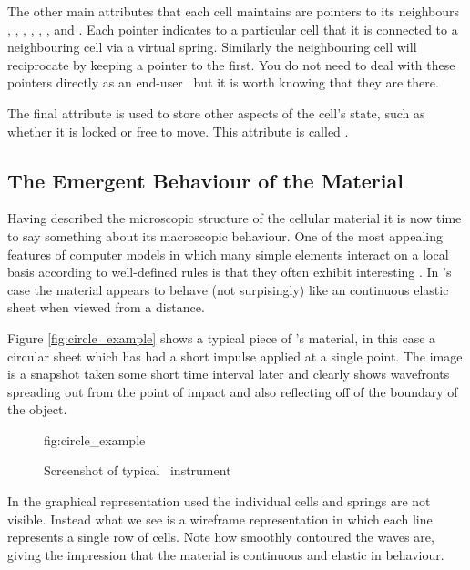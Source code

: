 The other main attributes that each cell maintains are pointers to its
neighbours , , ,
, , , 
and . Each pointer indicates to a particular cell that
it is connected to a neighbouring cell via a virtual spring. Similarly the
neighbouring cell will reciprocate by keeping a pointer to the first. You do
not need to deal with these pointers directly as an end-user \tao\ but it
is worth knowing that they are there. 

The final attribute is used to store other aspects of the cell's state,
such as whether it is locked or free to move. This attribute is called
.

\subsection{The Emergent Behaviour of the Material}
Having described the microscopic structure of the cellular material
it is now time to say something about its macroscopic behaviour.
One of the most appealing features of computer models in which many
simple elements interact on a local basis according to well-defined
rules is that they often exhibit interesting .
In \tao's case the material appears to behave (not surpisingly) like an
continuous elastic sheet when viewed from a distance.

Figure \ref{fig:circle_example} shows a typical piece of \tao's material,
in this case a circular sheet which has had a short impulse applied at a
single point. The image is a snapshot taken some short time interval later
and clearly shows wavefronts spreading out from the point of impact and
also reflecting off of the boundary of the object.

\begin{figure}[htb]
  \begin{Label}{fig:circle_example}
    \begin{center}
    \end{center}
    \caption{Screenshot of typical \tao\ instrument}
  \end{Label}
\end{figure}

In the graphical representation used the individual cells and springs
are not visible. Instead what we see is a wireframe representation in which
each line represents a single row of cells. Note how smoothly contoured
the waves are, giving the impression that the material is 
continuous and elastic in behaviour.


